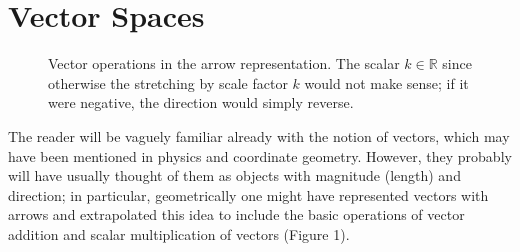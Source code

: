 \section{Vector Spaces}
\begin{center}
\begin{figure} [b]
\caption{Vector operations in the arrow representation. The scalar $k \in \mathbb{R}$ since otherwise the stretching by scale factor $k$ would not make sense; if it were negative, the direction would simply reverse.}
\end{figure}
\end{center}
The reader will be vaguely familiar already with the notion of vectors, which may have been mentioned in physics and coordinate geometry. However, they probably will have usually thought of them as objects with magnitude (length) and direction; in particular, geometrically one might have represented vectors with arrows and extrapolated this idea to include the basic operations of vector addition and scalar multiplication of vectors (Figure 1).
\\\\
